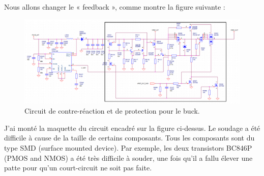 Nous allons changer le « feedback », comme montre la figure suivante :

\begin{figure}[H]
    \centering
    \includegraphics[width=1.00\textwidth]{images/circuit-contre-reaction-buck-v1}
    \caption{Circuit de contre-réaction et de protection pour le buck.}
    \label{fig:circuit-contre-reaction-buck-v1}
\end{figure}

J'ai monté la maquette du circuit encadré sur la figure ci-dessus. Le soudage a été difficile à cause de la taille de certains composants. Tous les composants sont du type SMD (surface mounted device). Par exemple, les deux transistors BC846P (PMOS and NMOS) a été très difficile à souder, une fois qu'il a fallu élever une patte pour qu'un court-circuit ne soit pas faite.


